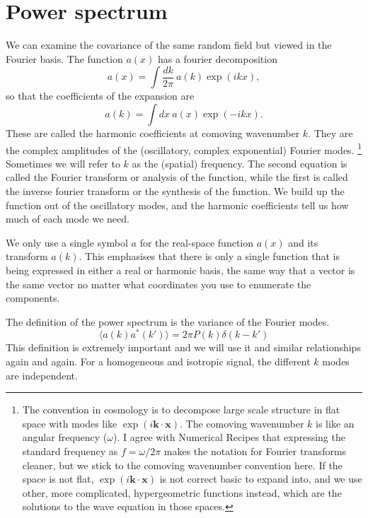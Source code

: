 \section{Power spectrum}
We can examine the covariance of the same random field but viewed in the Fourier basis.
The function $a(x)$ has a fourier decomposition
\begin{equation}
  a(x) = \int \frac{dk}{2\pi}\ a(k) \exp(i kx),
\end{equation}
so that the coefficients of the expansion are 
\begin{equation}
  a(k) = \int dx\ a(x) \exp(-i kx).
\end{equation}
These are called the harmonic coefficients at comoving wavenumber $k$.  They are the complex amplitudes of the (oscillatory, complex exponential) Fourier modes.%
%
\footnote{The convention in cosmology is to decompose large scale structure in flat space with modes like $\exp(i \mathbf{k} \cdot \mathbf{x})$.  The comoving wavenumber $k$ is like an angular frequency ($\omega$).  I agree with Numerical Recipes \citep{} that expressing the standard frequency as $f = \omega/2\pi$ makes the notation for Fourier transforms cleaner, but  we stick to the comoving wavenumber convention here.  If the space is not flat, $\exp(i \mathbf{k}\cdot \mathbf{x})$ is not correct basic to expand into, and we use other, more complicated, hypergeometric functions instead, which are the solutions to the wave equation in those spaces.}  Sometimes we will refer to $k$ as the (spatial) frequency.
The second equation is called the Fourier transform or analysis of the function, while the first is called the inverse fourier transform or the synthesis of the function.  We build up the function out of the oscillatory modes, and the harmonic coefficients tell us how much of each mode we need.

We only use a single symbol $a$ for the real-space function $a(x)$ and its transform $a(k)$.  This emphasises that there is only a single function that is being expressed in either a real or harmonic basis, the same way that a vector is the same vector no matter what coordinates you use to enumerate the components.

The definition of the power spectrum is the variance of the Fourier modes.
\begin{equation}
  \langle a(k) a^*(k') \rangle = 2\pi P(k) \delta(k - k') 
\end{equation}
This definition is extremely important and we will use it and similar relationships again and again.  For a homogeneous and isotropic signal, the different $k$ modes are independent.

